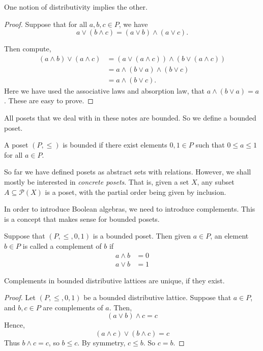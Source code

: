 \documentclass{owmaths}
\begin{document}
\begin{proposition}
    One notion of distributivity implies the other.
\end{proposition}
\begin{proof}
    Suppose that for all $a,b,c \in P$, we have
    \begin{equation*}
        a \vee (b \wedge c) = (a \vee b)\wedge (a \vee c).
    \end{equation*}
    
    Then compute,
    \begin{align*}
        (a \wedge b) \vee (a \wedge c) &= (a\vee(a\wedge c)) \wedge (b\vee (a\wedge c))\\
        &= a \wedge (b \vee a) \wedge (b\vee c)\\
        &= a \wedge (b \vee c).        
    \end{align*}
    Here we have used the associative laws and absorption law, that $a \wedge (b\vee a) = a$.
    These are easy to prove.
\end{proof}



All posets that we deal with in these notes are bounded. So we define a bounded
poset.
\begin{definition}
    A poset $(P,\leq)$ is bounded if there exist elements $0,1 \in P$
    such that $0\leq a \leq 1$ for all $a \in P$.
\end{definition}

So far we have defined posets as abstract sets with relations. However, we shall
mostly be interested in \emph{concrete posets}. That is, given a set
$X$, any subset $A \subseteq \mathcal{P}(X)$ is a poset,
with the partial order being given by inclusion.

In order to introduce Boolean algebras, we need to introduce complements.
This is a concept that makes sense for bounded posets.
\begin{definition}
    Suppose that $(P,\leq,0,1)$ is a bounded poset. Then given $a \in P$,
    an element $b \in P$ is called a complement of $b$ if
    \begin{align*}
        a \wedge b &= 0\\
        a \vee b &= 1
    \end{align*}
\end{definition}
\begin{proposition}
    Complements in bounded distributive lattices are unique, if they exist.
\end{proposition}
\begin{proof}
    Let $(P,\leq,0,1)$ be a bounded distributive lattice. Suppose that $a \in P$,
    and $b,c \in P$ are complements of $a$. Then,
    \begin{equation*}
        (a \vee  b) \wedge c = c
    \end{equation*}
    Hence,
    \begin{equation*}
        (a \wedge c) \vee (b \wedge c) = c
    \end{equation*}
    Thus $b \wedge c = c$, so $b \leq c$. By symmetry, $c \leq b$. So $c = b$.
\end{proof}
\end{document}

